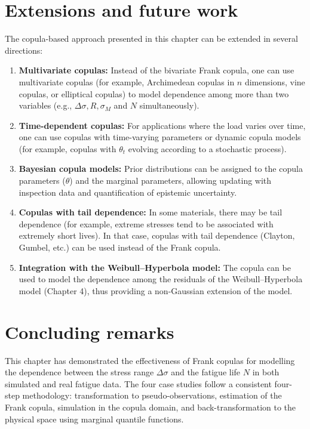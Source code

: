 \section{Extensions and future work}
\label{sec:extensions}

The copula-based approach presented in this chapter can be extended in several directions:

\begin{enumerate}
    \item \textbf{Multivariate copulas:} Instead of the bivariate Frank copula, one can use multivariate copulas (for example, Archimedean copulas in \(n\) dimensions, vine copulas, or elliptical copulas) to model dependence among more than two variables (e.g., \(\Delta\sigma, R, \sigma_M\) and \(N\) simultaneously).

    \item \textbf{Time-dependent copulas:} For applications where the load varies over time, one can use copulas with time-varying parameters or dynamic copula models (for example, copulas with \(\theta_t\) evolving according to a stochastic process).

    \item \textbf{Bayesian copula models:} Prior distributions can be assigned to the copula parameters (\(\theta\)) and the marginal parameters, allowing updating with inspection data and quantification of epistemic uncertainty.

    \item \textbf{Copulas with tail dependence:} In some materials, there may be tail dependence (for example, extreme stresses tend to be associated with extremely short lives). In that case, copulas with tail dependence (Clayton, Gumbel, etc.) can be used instead of the Frank copula.

    \item \textbf{Integration with the Weibull–Hyperbola model:} The copula can be used to model the dependence among the residuals of the Weibull–Hyperbola model (Chapter 4), thus providing a non-Gaussian extension of the model.
\end{enumerate}

\section{Concluding remarks}
\label{sec:concluding-remarks}

This chapter has demonstrated the effectiveness of Frank copulas for modelling the dependence between the stress range \(\Delta\sigma\) and the fatigue life \(N\) in both simulated and real fatigue data. The four case studies follow a consistent four-step methodology: transformation to pseudo-observations, estimation of the Frank copula, simulation in the copula domain, and back-transformation to the physical space using marginal quantile functions.

